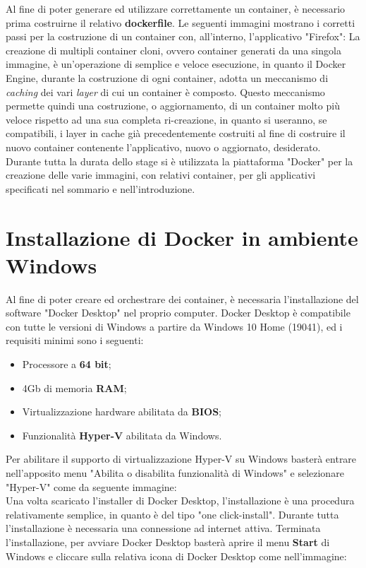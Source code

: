 Al fine di poter generare ed utilizzare correttamente un container, è necessario prima costruirne il relativo \textbf{\gls{dockerfile}}.
Le seguenti immagini mostrano i corretti passi per la costruzione di un container con, all'interno, l'applicativo "Firefox":
La creazione di multipli container cloni, ovvero container generati da una singola immagine, è un'operazione di semplice e veloce esecuzione, in quanto il Docker Engine, durante la costruzione di ogni container, adotta un meccanismo di \textit{\gls{caching}} dei vari \textit{\gls{layer}} di cui un container è composto. Questo meccanismo permette quindi una costruzione, o aggiornamento, di un container molto più veloce rispetto ad una sua completa ri-creazione, in quanto si useranno, se compatibili, i layer in cache già precedentemente costruiti al fine di costruire il nuovo container contenente l'applicativo, nuovo o aggiornato, desiderato.\\
Durante tutta la durata dello stage si è utilizzata la piattaforma "Docker" per la creazione delle varie immagini, con relativi container, per gli applicativi specificati nel sommario e nell'introduzione.

\section{Installazione di Docker in ambiente Windows}
Al fine di poter creare ed orchestrare dei container, è necessaria l'installazione del software "Docker Desktop" nel proprio computer. Docker Desktop è compatibile con tutte le versioni di Windows a partire da Windows 10 Home (19041), ed i requisiti minimi sono i seguenti:
\begin{itemize}
	\item Processore a \textbf{64 bit};
	\item 4Gb di memoria \textbf{RAM};
	\item Virtualizzazione hardware abilitata da \textbf{\gls{BIOS}};
	\item Funzionalità \textbf{Hyper-V} abilitata da Windows.
\end{itemize}
Per abilitare il supporto di virtualizzazione Hyper-V su Windows basterà entrare nell'apposito menu "Abilita o disabilita funzionalità di Windows" e selezionare "Hyper-V" come da seguente immagine:\\
Una volta scaricato l'\gls{installer} di Docker Desktop, l'installazione è una procedura relativamente semplice, in quanto è del tipo "one click-install". Durante tutta l'installazione è necessaria una connessione ad internet attiva.
Terminata l'installazione, per avviare Docker Desktop basterà aprire il menu \textbf{Start} di Windows e cliccare sulla relativa icona di Docker Desktop come nell'immagine:\\

